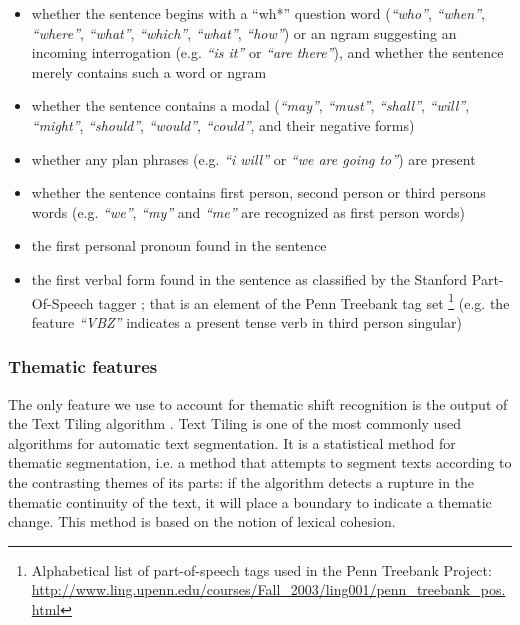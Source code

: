 \begin{itemize}
	\item whether the sentence begins with a ``wh*'' question word  (\textit{``who''}, \textit{``when''}, \textit{``where''}, \textit{``what''}, \textit{``which''}, \textit{``what''}, \textit{``how''}) or an ngram suggesting an incoming interrogation (e.g. \textit{``is it''} or \textit{``are there''}), and whether the sentence merely contains such a word or ngram
	\item whether the sentence contains a modal (\textit{``may''}, \textit{``must''}, \textit{``shall''}, \textit{``will''}, \textit{``might''}, \textit{``should''}, \textit{``would''}, \textit{``could''}, and their negative forms)
	\item whether any plan phrases (e.g. \textit{``i will''} or \textit{``we are going to''}) are present
	\item whether the sentence contains first person, second person or third persons words (e.g. \textit{``we''}, \textit{``my''} and \textit{``me''} are recognized as first person words)
	\item the first personal pronoun found in the sentence
	\item the first verbal form found in the sentence as classified by the Stanford Part-Of-Speech tagger ; that is an element of the Penn Treebank tag set \footnote{Alphabetical list of part-of-speech tags used in the Penn Treebank Project: \url{http://www.ling.upenn.edu/courses/Fall_2003/ling001/penn_treebank_pos.html}} (e.g. the feature \textit{``VBZ''} indicates a present tense verb in third person singular)
\end{itemize}

\subsubsection{Thematic features}

The only feature we use to account for thematic shift recognition is the output of the Text Tiling algorithm \cite{hearst1997texttiling}. Text Tiling is one of the most commonly used algorithms for automatic text segmentation. It is a statistical method for thematic segmentation, i.e. a method that attempts to segment texts according to the contrasting themes of its parts: if the algorithm detects a rupture in the thematic continuity of the text, it will place a boundary to indicate a thematic change. This method is based on the notion of lexical cohesion.